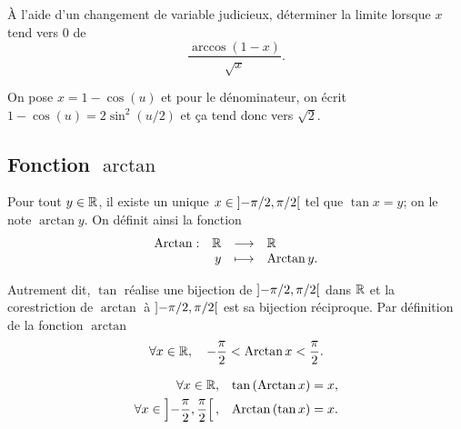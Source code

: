 \documentclass{magnolia}
\begin{document}
\begin{exoUnique}
\exo À l'aide d'un changement de variable judicieux, déterminer
  la limite lorsque $x$ tend vers 0 de
  \[\frac{\arccos(1-x)}{\sqrt{x}}.\]
\begin{sol}
On pose $x=1-\cos(u)$ et pour le dénominateur, on écrit $1-\cos(u)=2\sin^{2}(u/2)$ et ça tend donc vers $\sqrt{2}$.
\end{sol}
\end{exoUnique}

\subsection{Fonction $\arctan$}

\begin{definition}[utile=-3]
Pour tout $y\in\mathbb{R}$, il existe un unique $x\in\left]-\pi/2,\pi/2\right[$
tel que $\tan x=y$; on le note $\arctan y$. On définit ainsi la fonction
\[\begin{array}[t]{lrcl} \displaystyle{\operatorname{Arctan}} : & \displaystyle{\mathbb{R}} & \longrightarrow & \displaystyle{\mathbb{R}} \\ & \displaystyle{y} & \longmapsto & \displaystyle{\operatorname{Arctan}y.} \end{array}\]
\end{definition}

\begin{remarques}
\remarque Autrement dit, $\tan$ réalise une bijection de $\left]-\pi/2,\pi/2\right[$ dans $\mathbb{R}$ et la corestriction de $\arctan$ à $\left]-\pi/2,\pi/2\right[$ est sa bijection réciproque.
\remarque Par définition de la fonction $\arctan$
  \[\forall x\in\mathbb{R} ,\quad -\frac{\pi}{2}<\operatorname{Arctan} x<\frac{\pi}{2}.\]
\end{remarques}

\begin{proposition}[utile=-3]
\begin{eqnarray*}
\forall x\in\mathbb{R}, & & \tan\left(\operatorname{Arctan} x\right)=x,\\
\forall x\in\left]-\frac{\pi}{2},\frac{\pi}{2}\right[, & &
  \operatorname{Arctan}\left(\tan x\right)=x.  
\end{eqnarray*}
\end{proposition}
\end{document}
